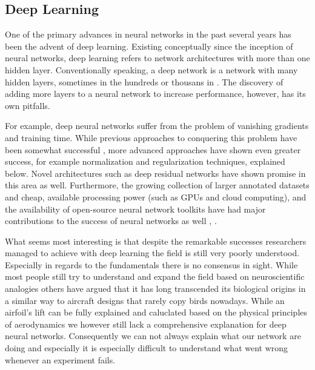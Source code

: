 


\subsection{Deep Learning}

One of the primary advances in neural networks in the past several years has been the advent of deep learning.  Existing conceptually since the inception of neural networks, deep learning refers to network architectures with more than one hidden layer.  Conventionally speaking, a deep network is a network with many hidden layers, sometimes in the hundreds or thousans in \cite{DBLP:journals/corr/HeZRS15}. The discovery of adding more layers to a neural network to increase performance, however, has its own pitfalls.

For example, deep neural networks suffer from the problem of vanishing gradients \cite{Hochreiter:01book} and training time.  While previous approaches to conquering this problem have been somewhat successful \cite{DBLP:journals/corr/abs-1206-5533}, more advanced approaches have shown even greater success, for example normalization and regularization techniques, explained below.  Novel architectures such as deep residual networks \cite{DBLP:journals/corr/HeZRS15} have shown promise in this area as well.  Furthermore, the growing collection of larger annotated datasets and cheap, available processing power (such as GPUs and cloud computing), and the availability of open-source neural network toolkits have had major contributions to the success of neural networks as well \cite{tensorflow2015-whitepaper}, \cite{DBLP:journals/corr/SynnaeveNACLLRU16}. %

What seems most interesting is that despite the remarkable successes researchers managed to achieve with deep learning the field is still very poorly understood. Especially in regards to the fundamentals there is no consensus in sight. While most people still try to understand and expand the field based on neuroscientific analogies others have argued that it has long transcended its biological origins in a similar way to aircraft designs that rarely copy birds nowadays. While an airfoil's lift can be fully explained and caluclated based on the physical principles of aerodynamics we however still lack a comprehensive explanation for deep neural networks. Consequently we can not always explain what our network are doing and especially it is especially difficult to understand what went wrong whenever an experiment fails.

